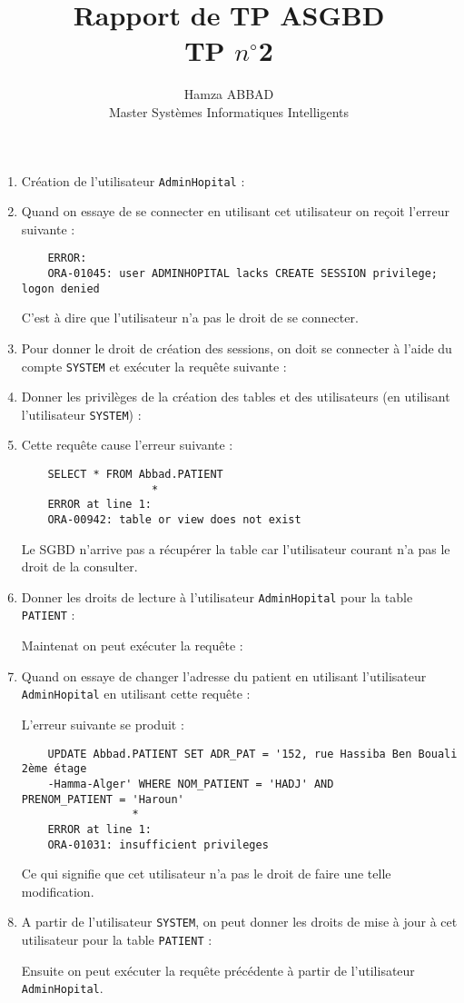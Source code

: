 \documentclass[12pt,a4paper]{article}
\author{Hamza ABBAD\\ Master Systèmes Informatiques Intelligents}
\title{\textbf{Rapport de TP ASGBD} \\ TP $n^{\circ}$2}
\begin{document}
\maketitle
\begin{enumerate}
	\item Création de l'utilisateur \texttt{AdminHopital} :
	
	\item Quand on essaye de se connecter en utilisant cet utilisateur on reçoit l'erreur suivante :
	\begin{verbatim}
	ERROR:
	ORA-01045: user ADMINHOPITAL lacks CREATE SESSION privilege; logon denied
	\end{verbatim}
	C'est à dire que l'utilisateur n'a pas le droit de se connecter.
	\item Pour donner le droit de création des sessions, on doit se connecter à l'aide du compte \texttt{SYSTEM}
	et exécuter la requête suivante :
	
	\item Donner les privilèges de la création des tables et des utilisateurs (en utilisant l'utilisateur \texttt{SYSTEM}) :
	
	\item Cette requête cause l'erreur suivante :
	\begin{verbatim}
	SELECT * FROM Abbad.PATIENT
                    *
	ERROR at line 1:
	ORA-00942: table or view does not exist
	\end{verbatim}
	Le SGBD n'arrive pas a récupérer la table car l'utilisateur courant n'a pas le droit de la consulter.
	\item Donner les droits de lecture à l'utilisateur \texttt{AdminHopital} pour la table \texttt{PATIENT} :
	
	Maintenat on peut exécuter la requête :
	
	\item Quand on essaye de changer l'adresse du patient en utilisant l'utilisateur \texttt{AdminHopital}
	en utilisant cette requête :
	
	L'erreur suivante se produit :
	\begin{verbatim}
	UPDATE Abbad.PATIENT SET ADR_PAT = '152, rue Hassiba Ben Bouali 2ème étage 
	-Hamma-Alger' WHERE NOM_PATIENT = 'HADJ' AND 		PRENOM_PATIENT = 'Haroun'
    	         *
	ERROR at line 1:
	ORA-01031: insufficient privileges
	\end{verbatim}
	Ce qui signifie que cet utilisateur n'a pas le droit de faire une telle modification.
	\item A partir de l'utilisateur \texttt{SYSTEM}, on peut donner les droits de mise à jour à cet utilisateur
	pour la table \texttt{PATIENT} :
	
	Ensuite on peut exécuter la requête précédente à partir de l'utilisateur \texttt{AdminHopital}.
	
\end{enumerate}
\end{document}
